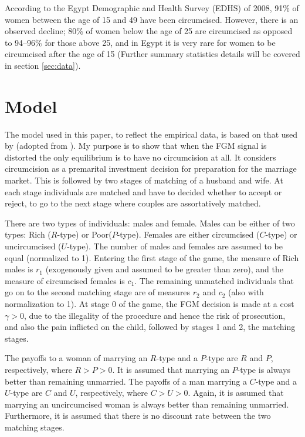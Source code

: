 \documentclass[12pt]{article}
\begin{document}
According to the Egypt Demographic and Health Survey (EDHS) of 2008, 91\% of women between the age of 15 and 49 have been circumcised.  However, there is an observed decline; 80\% of women below the age of 25 are circumcised as opposed to 94--96\% for those above 25, and in Egypt it is very rare for women to be circumcised after the age of 15 \citep{El-Zanat, El-Gibaly2002} (Further summary statistics details will be covered in section \ref{sec:data}).  

\section{Model}

The model used in this paper, to reflect the empirical data, is based on that used by \citet{Chesnokova2007} (adopted from \citet{Fernandez2005}).  My purpose is to show that when the FGM signal is distorted the only equilibrium is to have no circumcision at all.  It considers circumcision as a premarital investment decision for preparation for the marriage market.  This is followed by two stages of matching of a husband and wife.  At each stage individuals are matched and have to decided whether to accept or reject, to go to the next stage where couples are assortatively matched.

There are two types of individuals: males and female.  Males can be either of two types: Rich ($R$-type) or Poor($P$-type).  Females are either circumcised ($C$-type) or uncircumcised ($U$-type). The number of males and females are assumed to be equal (normalized to 1).  Entering the first stage of the game, the measure of Rich males is $r_1$ (exogenously given and assumed to be greater than zero), and the measure of circumcised females is  $c_1$. The remaining unmatched individuals that go on to the second matching stage are of measures $r_2$ and $c_2$ (also with normalization to 1). At stage 0 of the game, the FGM decision is made at a cost $\gamma > 0$, due to the illegality of the procedure and hence the risk of prosecution, and also the pain inflicted on the child, followed by stages 1 and 2, the matching stages.

The payoffs to a woman of marrying an $R$-type and a $P$-type are $R$ and $P$, respectively, where $R > P > 0$. It is assumed that marrying an $P$-type is always better than remaining unmarried. The payoffs of a man marrying a $C$-type and a $U$-type are $C$ and $U$, respectively, where $C > U > 0$. Again, it is assumed that marrying an uncircumcised woman is always better than remaining unmarried. Furthermore, it is assumed that there is no discount rate between the two matching stages.
\end{document}
